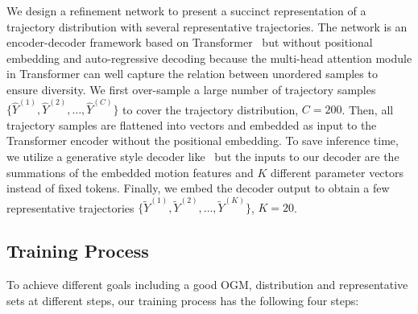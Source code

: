 \documentclass[10pt,twocolumn,letterpaper]{article}
\begin{document}
We design a refinement network to present a succinct representation of a trajectory distribution with several representative trajectories. The network is an encoder-decoder framework based on Transformer~\cite{vaswani2017attention} but without positional embedding and auto-regressive decoding because the multi-head attention module in Transformer can well capture the relation between unordered samples to ensure diversity. We first over-sample a large number of trajectory samples $\{\hat{Y}^{(1)},\hat{Y}^{(2)},\dots,\hat{Y}^{(C)}\}$ to cover the trajectory distribution, \eg $C=200$. Then, all trajectory samples are flattened into vectors and embedded as input to the Transformer encoder without the positional embedding. To save inference time, we utilize a generative style decoder like~\cite{zhou2021informer} but the inputs to our decoder are the summations of the embedded motion features and $K$ different parameter vectors instead of fixed tokens. Finally, we embed the decoder output to obtain a few representative trajectories $\{\tilde{Y}^{(1)},\tilde{Y}^{(2)},\dots,\tilde{Y}^{(K)}\}$, \eg $K=20$. 

\subsection{Training Process}

To achieve different goals including a good OGM, distribution and representative sets at different steps, our training process has the following four steps:
\end{document}
